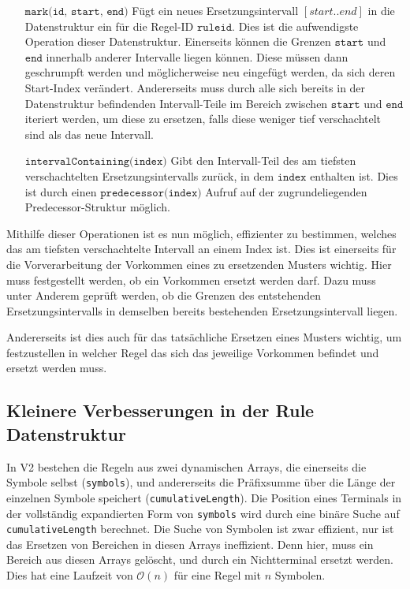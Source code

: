 \begin{itemize}[leftmargin=5cm]
	\item[$\texttt{mark(id, start, end)}$] Fügt ein neues Ersetzungsintervall $[start.. end]$ in die Datenstruktur ein für die Regel-ID $\texttt{ruleid}$. Dies ist die aufwendigste Operation dieser Datenstruktur. Einerseits können die Grenzen $\texttt{start}$ und $\texttt{end}$ innerhalb anderer Intervalle liegen können. Diese müssen dann geschrumpft werden und möglicherweise neu eingefügt werden, da sich deren Start-Index verändert. Andererseits muss durch alle sich bereits in der Datenstruktur befindenden Intervall-Teile im Bereich zwischen $\texttt{start}$ und $\texttt{end}$ iteriert werden, um diese zu ersetzen, falls diese weniger tief verschachtelt sind als das neue Intervall.
	\item[$\texttt{intervalContaining(index)}$] Gibt den Intervall-Teil des am tiefsten verschachtelten Ersetzungsintervalls zurück, in dem $\texttt{index}$ enthalten ist. Dies ist durch einen $\texttt{predecessor(index)}$ Aufruf auf der zugrundeliegenden Predecessor-Struktur möglich.
\end{itemize}

Mithilfe dieser Operationen ist es nun möglich, effizienter zu bestimmen, welches das am tiefsten verschachtelte Intervall an einem Index ist. Dies ist einerseits für die Vorverarbeitung der Vorkommen eines zu ersetzenden Musters wichtig. Hier muss festgestellt werden, ob ein Vorkommen ersetzt werden darf. Dazu muss unter Anderem geprüft werden, ob die Grenzen des entstehenden Ersetzungsintervalls in demselben bereits bestehenden Ersetzungsintervall liegen. 

Andererseits ist dies auch für das tatsächliche Ersetzen eines Musters wichtig, um festzustellen in welcher Regel das sich das jeweilige Vorkommen befindet und ersetzt werden muss.

\subsection{Kleinere Verbesserungen in der Rule Datenstruktur}

In V2 bestehen die Regeln aus zwei dynamischen Arrays, die einerseits die Symbole selbst (\texttt{symbols}), und andererseits die Präfixsumme über die Länge der einzelnen Symbole speichert (\texttt{cumulativeLength}).
Die Position eines Terminals in der vollständig expandierten Form von \texttt{symbols} wird durch eine binäre Suche auf \texttt{cumulativeLength} berechnet. Die Suche von Symbolen ist zwar effizient, nur ist das Ersetzen von Bereichen in diesen Arrays ineffizient. Denn hier, muss ein Bereich aus diesen Arrays gelöscht, und durch ein Nichtterminal ersetzt werden. Dies hat eine Laufzeit von $\mathcal{O}(n)$ für eine Regel mit $n$ Symbolen.

